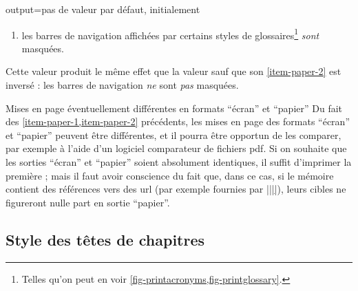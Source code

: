 \begin{docKey}{output}{=\textbar{}\textbar{}}{pas
    de valeur par défaut, initialement }
\begin{description}
\begin{enumerate}
\begin{enumerate}
      \end{enumerate}
    \item%
      \label{item-paper-2}%
      les barres de navigation affichées par certains styles de
      glossaires\footnote{Telles qu'on peut en voir
        \vref{fig-printacronyms,fig-printglossary}.} \emph{sont} masquées.
    \end{enumerate}
  \item[\docValue{paper*}.]%
    Cette valeur produit le même effet que la valeur  sauf que
    son \vref{item-paper-2} est inversé : les barres de navigation \emph{ne}
    sont \emph{pas} masquées.
  \end{description}
\end{docKey}

\begin{dbwarning}{Mises en page éventuellement différentes en formats
    \enquote{écran} et \enquote{papier}}{}
  Du fait des \cref{item-paper-1,item-paper-2} précédents, les mises en page des
  formats \enquote{écran} et \enquote{papier} peuvent être différentes, et il
  pourra être opportun de les comparer, par exemple à l'aide d'un logiciel
  comparateur de fichiers \acrshort{pdf}. Si on souhaite que les sorties
  \enquote{écran} et \enquote{papier} soient absolument identiques, il suffit
  d'imprimer la première ; mais il faut avoir conscience du fait que, dans ce
  cas, si le mémoire contient des références vers des \acrshort{url} (par
  exemple fournies par
  |\href{|\meta{\normalfont\ttfamily\acrshort*{url}}|}{||}|), leurs
  cibles ne figureront nulle part en sortie \enquote{papier}.
\end{dbwarning}

\subsection{Style des têtes de chapitres}\label{sec-style-des-tetes}

